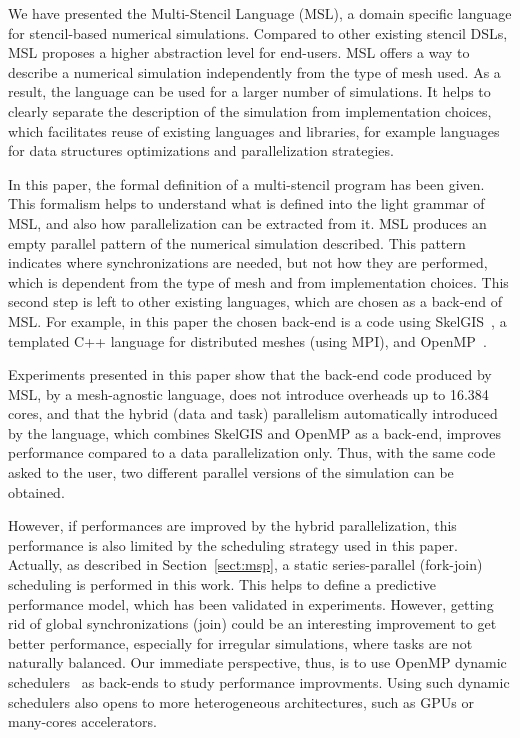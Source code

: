 We have presented the Multi-Stencil Language (MSL), a domain specific language for stencil-based numerical simulations. Compared to other existing stencil DSLs, MSL proposes a higher abstraction level for end-users. MSL offers a way to describe a numerical simulation independently from the type of mesh used. As a result, the language can be used for a larger number of simulations. It helps to clearly separate the description of the simulation from implementation choices, which facilitates reuse of existing languages and libraries, for example languages for data structures optimizations and parallelization strategies. 

In this paper, the formal definition of a multi-stencil program has been given. This formalism helps to understand what is defined into the light grammar of MSL, and also how parallelization can be extracted from it. MSL produces an empty parallel pattern of the numerical simulation described. This pattern indicates where synchronizations are needed, but not how they are performed, which is dependent from the type of mesh and from implementation choices. This second step is left to other existing languages, which are chosen as a back-end of MSL. For example, in this paper the chosen back-end is a code using SkelGIS~\cite{CPE:CPE3494,DBLP:conf/ieeehpcs/HeleneS13,DBLP:conf/europar/CoullonL14}, a templated C++ language for distributed meshes (using MPI), and OpenMP~\cite{660313}.

Experiments presented in this paper show that the back-end code produced by MSL, \ie by a mesh-agnostic language, does not introduce overheads up to 16.384 cores, and that the hybrid (data and task) parallelism automatically introduced by the language, which combines SkelGIS and OpenMP as a back-end, improves performance compared to a data parallelization only. Thus, with the same code asked to the user, two different parallel versions of the simulation can be obtained.

However, if performances are improved by the hybrid parallelization, this performance is also limited by the scheduling strategy used in this paper. Actually, as described in Section~\ref{sect:msp}, a static series-parallel (fork-join) scheduling is performed in this work. This helps to define a predictive performance model, which has been validated in experiments. However, getting rid of global synchronizations (join) could be an interesting improvement to get better performance, especially for irregular simulations, where tasks are not naturally balanced. Our immediate perspective, thus, is to use OpenMP dynamic schedulers~\cite{Gautier:2013:XRS:2510661.2511383,Augonnet2011,wu:hal-01078359} as back-ends to study performance improvments. Using such dynamic schedulers also opens to more heterogeneous architectures, such as GPUs or many-cores accelerators.

